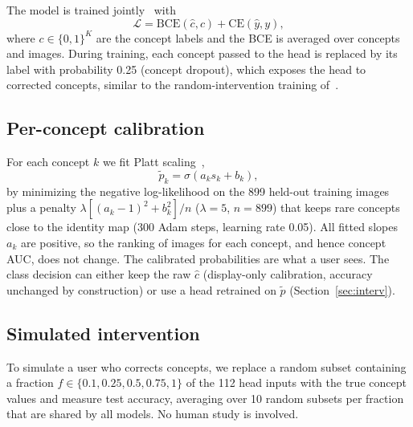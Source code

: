 \documentclass[conference]{IEEEtran}
\begin{document}
The model is trained jointly~\cite{koh2020concept} with
\begin{equation}
\mathcal{L}=\mathrm{BCE}(\hat c, c)+\mathrm{CE}(\hat y, y),
\label{eq:loss}
\end{equation}
where $c\in\{0,1\}^K$ are the concept labels and the BCE is averaged over concepts and images. During training, each concept passed to the head is replaced by its label with probability 0.25 (concept dropout), which exposes the head to corrected concepts, similar to the random-intervention training of~\cite{espinosa2022concept}.

\subsection{Per-concept calibration}
For each concept $k$ we fit Platt scaling~\cite{platt1999probabilistic},
\begin{equation}
\tilde p_k=\sigma(a_k s_k + b_k),
\label{eq:platt}
\end{equation}
by minimizing the negative log-likelihood on the 899 held-out training images plus a penalty $\lambda[(a_k-1)^2+b_k^2]/n$ ($\lambda=5$, $n=899$) that keeps rare concepts close to the identity map (300 Adam steps, learning rate 0.05). All fitted slopes $a_k$ are positive, so the ranking of images for each concept, and hence concept AUC, does not change. The calibrated probabilities are what a user sees. The class decision can either keep the raw $\hat c$ (display-only calibration, accuracy unchanged by construction) or use a head retrained on $\tilde p$ (Section~\ref{sec:interv}).

\subsection{Simulated intervention}
To simulate a user who corrects concepts, we replace a random subset containing a fraction $f\in\{0.1,0.25,0.5,0.75,1\}$ of the 112 head inputs with the true concept values and measure test accuracy, averaging over 10 random subsets per fraction that are shared by all models. No human study is involved.
\end{document}
